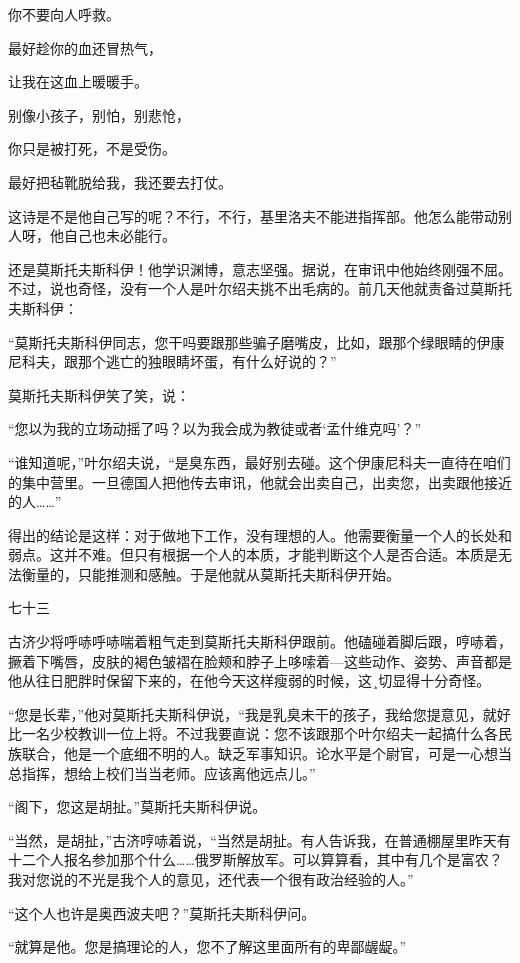 你不要向人呼救。

最好趁你的血还冒热气，

让我在这血上暖暖手。

别像小孩子，别怕，别悲怆，

你只是被打死，不是受伤。

最好把毡靴脱给我，我还要去打仗。

这诗是不是他自己写的呢？不行，不行，基里洛夫不能进指挥部。他怎么能带动别人呀，他自己也未必能行。

还是莫斯托夫斯科伊！他学识渊博，意志坚强。据说，在审讯中他始终刚强不屈。不过，说也奇怪，没有一个人是叶尔绍夫挑不出毛病的。前几天他就责备过莫斯托夫斯科伊：

“莫斯托夫斯科伊同志，您干吗要跟那些骗子磨嘴皮，比如，跟那个绿眼睛的伊康尼科夫，跟那个逃亡的独眼睛坏蛋，有什么好说的？”

莫斯托夫斯科伊笑了笑，说：

“您以为我的立场动摇了吗？以为我会成为教徒或者‘孟什维克吗’？”

“谁知道呢，”叶尔绍夫说，“是臭东西，最好别去碰。这个伊康尼科夫一直待在咱们的集中营里。一旦德国人把他传去审讯，他就会出卖自己，出卖您，出卖跟他接近的人……”

得出的结论是这样：对于做地下工作，没有理想的人。他需要衡量一个人的长处和弱点。这并不难。但只有根据一个人的本质，才能判断这个人是否合适。本质是无法衡量的，只能推测和感触。于是他就从莫斯托夫斯科伊开始。

七十三

古济少将呼哧呼哧喘着粗气走到莫斯托夫斯科伊跟前。他磕碰着脚后跟，哼哧着，撅着下嘴唇，皮肤的褐色皱褶在脸颊和脖子上哆嗦着—这些动作、姿势、声音都是他从往日肥胖时保留下来的，在他今天这样瘦弱的时候，这¸切显得十分奇怪。

“您是长辈，”他对莫斯托夫斯科伊说，“我是乳臭未干的孩子，我给您提意见，就好比一名少校教训一位上将。不过我要直说：您不该跟那个叶尔绍夫一起搞什么各民族联合，他是一个底细不明的人。缺乏军事知识。论水平是个尉官，可是一心想当总指挥，想给上校们当当老师。应该离他远点儿。”

“阁下，您这是胡扯。”莫斯托夫斯科伊说。

“当然，是胡扯，”古济哼哧着说，“当然是胡扯。有人告诉我，在普通棚屋里昨天有十二个人报名参加那个什么……俄罗斯解放军。可以算算看，其中有几个是富农？我对您说的不光是我个人的意见，还代表一个很有政治经验的人。”

“这个人也许是奥西波夫吧？”莫斯托夫斯科伊问。

“就算是他。您是搞理论的人，您不了解这里面所有的卑鄙龌龊。”

